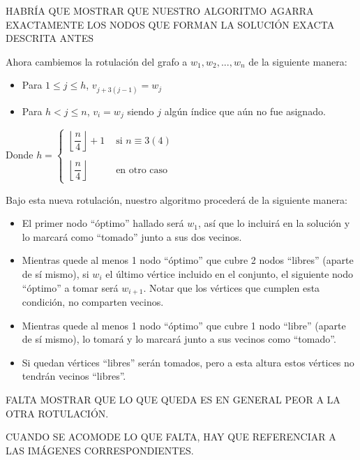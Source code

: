 HABRÍA QUE MOSTRAR QUE NUESTRO ALGORITMO AGARRA EXACTAMENTE LOS NODOS QUE FORMAN LA SOLUCIÓN EXACTA DESCRITA ANTES

Ahora cambiemos la rotulación del grafo a $w_1,w_2,...,w_n$ de la siguiente manera:

\begin{itemize}
\item Para $1 \leq j \leq h$, $v_{j+3(j-1)} = w_j$
\item Para $h < j \leq n$, $v_i = w_j$ siendo $j$ algún índice que aún no fue asignado.
\end{itemize}

Donde $h =
\begin{cases}
\left\lfloor \dfrac{n}{4} \right\rfloor + 1 & \text{ si } n \equiv 3 (4)\\\\
\left\lfloor \dfrac{n}{4} \right\rfloor & \text{ en otro caso }
\end{cases}$

Bajo esta nueva rotulación, nuestro algoritmo procederá de la siguiente manera:

\begin{itemize}
\item El primer nodo ``óptimo'' hallado será $w_1$, así que lo incluirá en la solución y lo marcará como ``tomado'' junto a sus dos vecinos. 
\item Mientras quede al menos 1 nodo ``óptimo'' que cubre 2 nodos ``libres'' (aparte de sí mismo), si $w_i$ el último vértice incluido en el conjunto, el siguiente nodo ``óptimo'' a tomar será $w_{i+1}$.  Notar que los vértices que cumplen esta condición, no comparten vecinos.
\item Mientras quede al menos 1 nodo ``óptimo'' que cubre 1 nodo ``libre'' (aparte de sí mismo), lo tomará y lo marcará junto a sus vecinos como ``tomado''.
\item Si quedan vértices ``libres'' serán tomados, pero a esta altura estos vértices no tendrán vecinos ``libres''.
\end{itemize}

FALTA MOSTRAR QUE LO QUE QUEDA ES EN GENERAL PEOR A LA OTRA ROTULACIÓN.

CUANDO SE ACOMODE LO QUE FALTA, HAY QUE REFERENCIAR A LAS IMÁGENES CORRESPONDIENTES.




